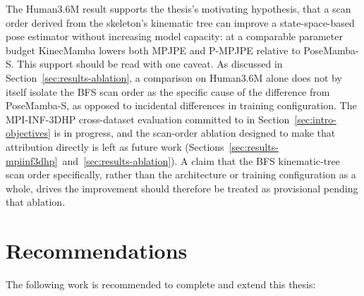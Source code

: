 The Human3.6M result supports the thesis's motivating hypothesis, that a
scan order derived from the skeleton's kinematic tree can improve a
state-space-based pose estimator without increasing model capacity: at a
comparable parameter budget KinecMamba lowers both MPJPE and P-MPJPE relative
to PoseMamba-S. This support should be read with one caveat. As discussed in
Section~\ref{sec:results-ablation}, a comparison on Human3.6M alone does not
by itself isolate the BFS scan order as the specific cause of the difference
from PoseMamba-S, as opposed to incidental differences in training
configuration. The MPI-INF-3DHP cross-dataset evaluation committed to in
Section~\ref{sec:intro-objectives} is in progress, and the scan-order
ablation designed to make that attribution directly is left as future work
(Sections~\ref{sec:results-mpiinf3dhp}~and~\ref{sec:results-ablation}). A
claim that the BFS kinematic-tree scan order specifically, rather than the
architecture or training configuration as a whole, drives the improvement
should therefore be treated as provisional pending that ablation.

\section{Recommendations}
\label{sec:conclusion-recommendations}

The following work is recommended to complete and extend this thesis:

